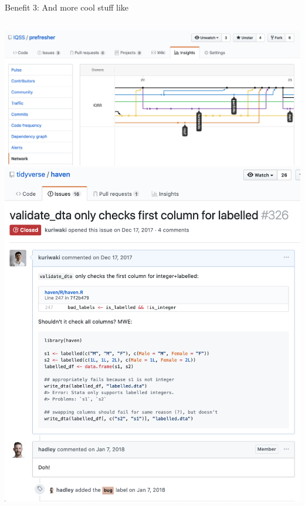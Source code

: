 \documentclass[ignorenonframetext,notes, 10pt, aspectratio=169]{beamer}
\begin{document}
\begin{frame}{Benefit 3: And more cool stuff like}
\begin{columns}[T]
\begin{column}{0.7\textwidth}
 {\includegraphics[width = \linewidth]{prefresher-network.png}}
 {\includegraphics[width = 0.7\linewidth]{file-issues.png}}
\end{column}
\end{columns}
\end{frame}
\end{document}
